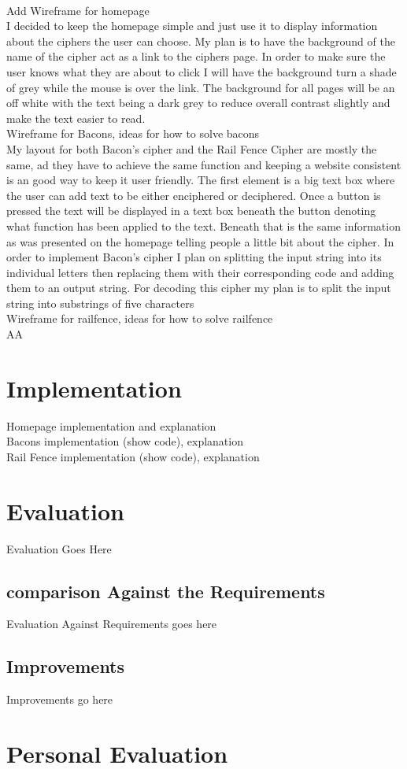 \documentclass[10pt, a4paper]{article}
\begin{document}
	\paragraph{}Add Wireframe for homepage \\ I decided to keep the homepage simple and just use it to display information about the ciphers the user can choose. My plan is to have the background of the name of the cipher act as a link to the ciphers page. In order to make sure the user knows what they are about to click I will have the background turn a shade of grey while the mouse is over the link. The background for all pages will be an off white with the text being a dark grey to reduce overall contrast slightly and make the text easier to read.\\Wireframe for Bacons, ideas for how to solve bacons \\ My layout for both Bacon's cipher and the Rail Fence Cipher are mostly the same, ad they have to achieve the same function and keeping a website consistent is an good way to keep it user friendly. The first element is a big text box where the user can add text to be either enciphered or deciphered. Once a button is pressed the text will be displayed in a text box beneath the button denoting what function has been applied to the text. Beneath that is the same information as was presented on the homepage telling people a little bit about the cipher. In order to implement Bacon's cipher I plan on splitting the input string into its individual letters then replacing them with their corresponding code and adding them to an output string. For decoding this cipher my plan is to split the input string into substrings of five characters \\Wireframe for railfence, ideas for how to solve railfence \\ AA
	
	
	\section{Implementation}
	Homepage implementation and explanation\\Bacons implementation (show code), explanation \\ Rail Fence implementation (show code), explanation
	
	\section{Evaluation}
	Evaluation Goes Here
	
	\subsection{comparison Against the Requirements}
	Evaluation Against Requirements goes here
	
	\subsection{Improvements}
	Improvements go here
    
    
	\section{Personal Evaluation}
		
	
	
		
\end{document}
